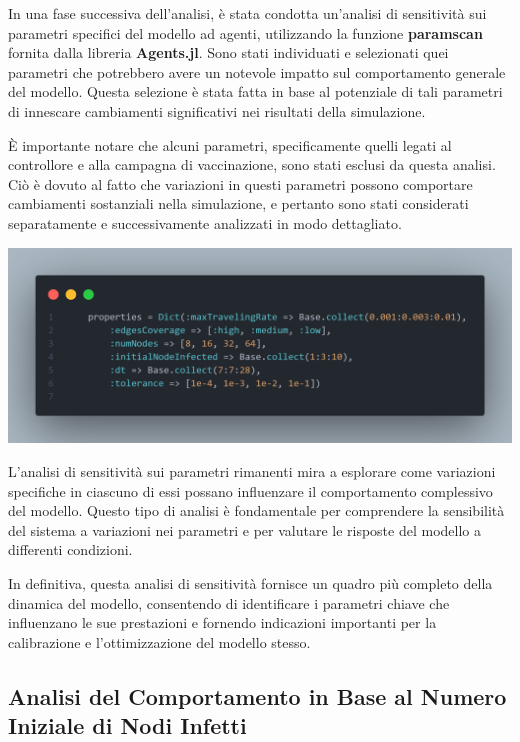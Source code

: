 In una fase successiva dell'analisi, è stata condotta un'analisi di 
sensitività sui parametri specifici del modello ad agenti, 
utilizzando la funzione \textbf{paramscan} fornita dalla libreria 
\textbf{Agents.jl}. Sono stati individuati e selezionati quei 
parametri che potrebbero avere un notevole impatto sul comportamento 
generale del modello. Questa selezione è stata fatta in base al 
potenziale di tali parametri di innescare cambiamenti significativi nei 
risultati della simulazione.

È importante notare che alcuni parametri, specificamente quelli 
legati al controllore e alla campagna di vaccinazione, sono stati 
esclusi da questa analisi. Ciò è dovuto al fatto che variazioni in 
questi parametri possono comportare cambiamenti sostanziali nella 
simulazione, e pertanto sono stati considerati separatamente e 
successivamente analizzati in modo dettagliato.

\begin{minipage}{\linewidth}
	\centering
	\includegraphics[width=\textwidth]{img/paramscan.png}
	\label{fig:paramscan}
\end{minipage}

L'analisi di sensitività sui parametri rimanenti mira a esplorare 
come variazioni specifiche in ciascuno di essi possano influenzare 
il comportamento complessivo del modello. Questo tipo di analisi è 
fondamentale per comprendere la sensibilità del sistema a variazioni 
nei parametri e per valutare le risposte del modello a differenti 
condizioni.

In definitiva, questa analisi di sensitività fornisce un quadro più 
completo della dinamica del modello, consentendo di identificare i 
parametri chiave che influenzano le sue prestazioni e fornendo 
indicazioni importanti per la calibrazione e l'ottimizzazione del 
modello stesso.
\newpage

\subsection{Analisi del Comportamento in Base al Numero Iniziale di Nodi Infetti}

